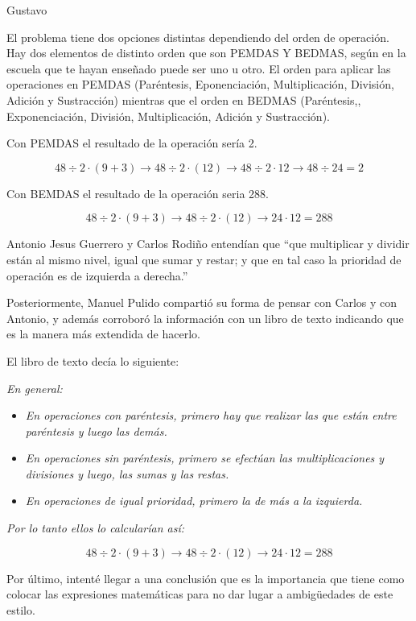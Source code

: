\begin{opin}{\guscolor}{Gustavo}
\begin{mdframed}
El problema tiene dos opciones distintas dependiendo del orden de operación. Hay dos elementos de distinto orden que son PEMDAS Y BEDMAS, según en la escuela que te hayan enseñado puede ser uno u otro. El orden para aplicar las operaciones en PEMDAS (Paréntesis, Eponenciación, Multiplicación, División, Adición y Sustracción) mientras que el orden en BEDMAS (Paréntesis,, Exponenciación, División, Multiplicación, Adición y Sustracción). 

Con PEMDAS el resultado de la operación sería 2.

\[
48÷2·(9+3) \to 48 ÷ 2·(12) \to 48÷2·12 \to 48÷24 = 2
\]

Con BEMDAS  el resultado de la operación seria 288.

\[
48÷2·(9+3) \to 48 ÷ 2·(12) \to 24·12 = 288
\]

\end{mdframed}

Antonio Jesus Guerrero y Carlos Rodiño entendían que “que multiplicar y dividir están al mismo nivel, igual que sumar y restar; y que en tal caso la prioridad de operación es de izquierda a derecha.”

Posteriormente, Manuel Pulido compartió su forma de pensar con Carlos y con Antonio,  y además corroboró la información con un libro de texto indicando que es la manera más extendida de hacerlo.

El libro de texto decía lo siguiente:

\textit{En general:}

\begin{itemize}
\item \textit{En operaciones con paréntesis, primero hay que realizar las que están entre paréntesis y luego las demás.}
\item \textit{En operaciones sin paréntesis, primero se efectúan las multiplicaciones y divisiones y luego, las sumas y las restas.}
\item \textit{En operaciones de igual prioridad, primero la de más a la izquierda.}
\end{itemize}

\textit{Por lo tanto ellos lo calcularían así:}

\[
48÷2·(9+3) \to 48 ÷ 2·(12) \to 24·12 = 288
\]



Por último, intenté llegar a una conclusión que es la importancia que tiene como colocar las expresiones matemáticas para no dar lugar a ambigüedades de este estilo.



\end{opin}
